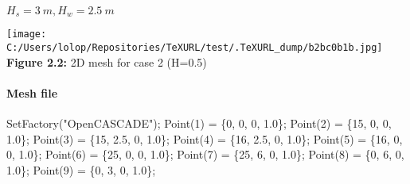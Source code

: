 \documentclass[11pt]{article}
\newenvironment{Shaded}{}{}
\newcommand{\DecValTok}[1]{\textcolor[rgb]{0.25,0.63,0.44}{{#1}}}
\newcommand{\FloatTok}[1]{\textcolor[rgb]{0.25,0.63,0.44}{{#1}}}
\newcommand{\StringTok}[1]{\textcolor[rgb]{0.25,0.44,0.63}{{#1}}}
\newcommand{\NormalTok}[1]{{#1}}
\newcommand{\OperatorTok}[1]{\textcolor[rgb]{0.40,0.40,0.40}{{#1}}}
\begin{document}
\(H_s = 3\ m, H_w = 2.5\ m\)

\texttt{[image: C:/Users/lolop/Repositories/TeXURL/test/.TeXURL\_dump/b2bc0b1b.jpg]} \textbf{Figure 2.2:}
2D mesh for case 2 (H=0.5)

\hypertarget{mesh-file-1}{%
\paragraph{Mesh file}\label{mesh-file-1}}

\begin{Shaded}
\begin{Highlighting}[]
\NormalTok{SetFactory}\OperatorTok{(}\StringTok{"OpenCASCADE"}\OperatorTok{);}
\NormalTok{Point}\OperatorTok{(}\DecValTok{1}\OperatorTok{)} \OperatorTok{=} \OperatorTok{\{}\DecValTok{0}\OperatorTok{,} \DecValTok{0}\OperatorTok{,} \DecValTok{0}\OperatorTok{,} \FloatTok{1.0}\OperatorTok{\};}
\NormalTok{Point}\OperatorTok{(}\DecValTok{2}\OperatorTok{)} \OperatorTok{=} \OperatorTok{\{}\DecValTok{15}\OperatorTok{,} \DecValTok{0}\OperatorTok{,} \DecValTok{0}\OperatorTok{,} \FloatTok{1.0}\OperatorTok{\};}
\NormalTok{Point}\OperatorTok{(}\DecValTok{3}\OperatorTok{)} \OperatorTok{=} \OperatorTok{\{}\DecValTok{15}\OperatorTok{,} \FloatTok{2.5}\OperatorTok{,} \DecValTok{0}\OperatorTok{,} \FloatTok{1.0}\OperatorTok{\};}
\NormalTok{Point}\OperatorTok{(}\DecValTok{4}\OperatorTok{)} \OperatorTok{=} \OperatorTok{\{}\DecValTok{16}\OperatorTok{,} \FloatTok{2.5}\OperatorTok{,} \DecValTok{0}\OperatorTok{,} \FloatTok{1.0}\OperatorTok{\};}
\NormalTok{Point}\OperatorTok{(}\DecValTok{5}\OperatorTok{)} \OperatorTok{=} \OperatorTok{\{}\DecValTok{16}\OperatorTok{,} \DecValTok{0}\OperatorTok{,} \DecValTok{0}\OperatorTok{,} \FloatTok{1.0}\OperatorTok{\};}
\NormalTok{Point}\OperatorTok{(}\DecValTok{6}\OperatorTok{)} \OperatorTok{=} \OperatorTok{\{}\DecValTok{25}\OperatorTok{,} \DecValTok{0}\OperatorTok{,} \DecValTok{0}\OperatorTok{,} \FloatTok{1.0}\OperatorTok{\};}
\NormalTok{Point}\OperatorTok{(}\DecValTok{7}\OperatorTok{)} \OperatorTok{=} \OperatorTok{\{}\DecValTok{25}\OperatorTok{,} \DecValTok{6}\OperatorTok{,} \DecValTok{0}\OperatorTok{,} \FloatTok{1.0}\OperatorTok{\};}
\NormalTok{Point}\OperatorTok{(}\DecValTok{8}\OperatorTok{)} \OperatorTok{=} \OperatorTok{\{}\DecValTok{0}\OperatorTok{,} \DecValTok{6}\OperatorTok{,} \DecValTok{0}\OperatorTok{,} \FloatTok{1.0}\OperatorTok{\};}
\NormalTok{Point}\OperatorTok{(}\DecValTok{9}\OperatorTok{)} \OperatorTok{=} \OperatorTok{\{}\DecValTok{0}\OperatorTok{,} \DecValTok{3}\OperatorTok{,} \DecValTok{0}\OperatorTok{,} \FloatTok{1.0}\OperatorTok{\};}

\end{Highlighting}
\end{Shaded}
\end{document}
